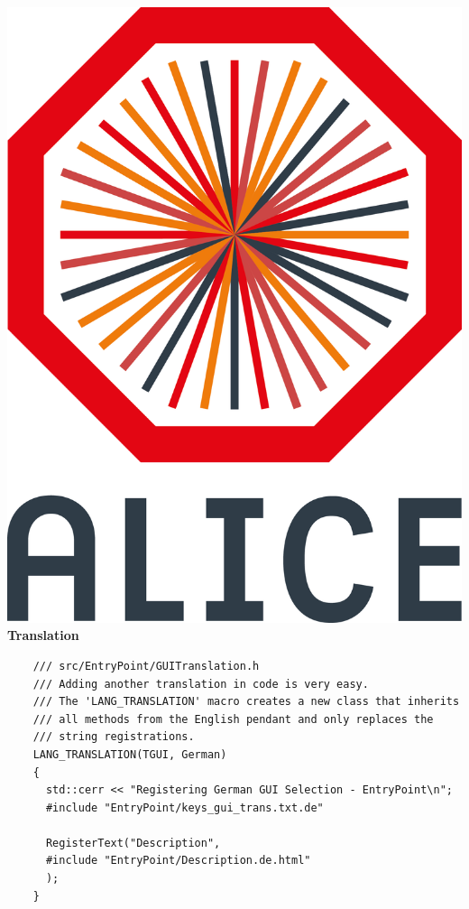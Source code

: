 \documentclass[aspectratio=1610,14pt,dvipsnames]{beamer}
\begin{document}
\begin{frame}[fragile]{\includegraphics[height=0.07\textheight]{2012-Jul-04-4_Color_Logo_CB.png} \hspace{0.2cm}\textbf{Translation}}
  \begin{verbatim}
    /// src/EntryPoint/GUITranslation.h
    /// Adding another translation in code is very easy.
    /// The 'LANG_TRANSLATION' macro creates a new class that inherits
    /// all methods from the English pendant and only replaces the
    /// string registrations.
    LANG_TRANSLATION(TGUI, German)
    {
      std::cerr << "Registering German GUI Selection - EntryPoint\n";
      #include "EntryPoint/keys_gui_trans.txt.de"

      RegisterText("Description",
      #include "EntryPoint/Description.de.html"
      );
    }
  \end{verbatim}
\end{frame}
\end{document}
